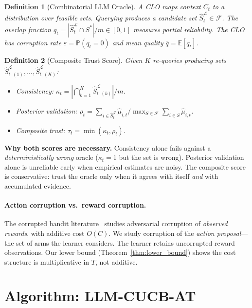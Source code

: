 \documentclass{article}
\newtheorem{definition}{Definition}
\newcommand{\E}{\mathbb{E}}
\newcommand{\Prob}{\mathbb{P}}
\newcommand{\Fset}{\mathcal{F}}
\newcommand{\Lset}{\mathcal{L}}
\newcommand{\SL}{\hat{S}^{\Lset}_t}
\newcommand{\Sstar}{S^{*}}
\begin{document}
\begin{definition}[Combinatorial LLM Oracle]
A CLO maps context $C_t$ to a distribution over feasible sets.
Querying produces a candidate set $\SL \in \Fset$.
The \emph{overlap fraction} $q_t = |\SL \cap \Sstar|/m \in [0,1]$ measures partial reliability.
The CLO has corruption rate $\varepsilon = \Prob(q_t = 0)$ and mean quality $\bar{q} = \E[q_t]$.
\end{definition}

\begin{definition}[Composite Trust Score]
Given $K$ re-queries producing sets $\SL_{(1)}, \ldots, \SL_{(K)}$:
\begin{itemize}
    \item Consistency: $\kappa_t = |\bigcap_{k=1}^{K} \SL_{(k)}| / m$.
    \item Posterior validation: $\rho_t = \sum_{i \in \SL} \hat{\mu}_{i,t} \big/ \max_{S \in \Fset} \sum_{i \in S} \hat{\mu}_{i,t}$.
    \item Composite trust: $\tau_t = \min(\kappa_t, \rho_t)$.
\end{itemize}
\end{definition}

\textbf{Why both scores are necessary.}
Consistency alone fails against a \emph{deterministically wrong} oracle ($\kappa_t = 1$ but the set is wrong).
Posterior validation alone is unreliable early when empirical estimates are noisy.
The composite score is conservative: trust the oracle only when it agrees with itself \emph{and} with accumulated evidence.

\paragraph{Action corruption vs.\ reward corruption.}
The corrupted bandit literature~\citep{lykouris2018,he2022nearly} studies adversarial corruption of \emph{observed rewards}, with additive cost $O(C)$.
We study corruption of the \emph{action proposal}---the set of arms the learner considers.
The learner retains uncorrupted reward observations.
Our lower bound (Theorem~\ref{thm:lower_bound}) shows the cost structure is multiplicative in $T$, not additive.

\section{Algorithm: LLM-CUCB-AT}
\label{sec:algorithm}
\end{document}
